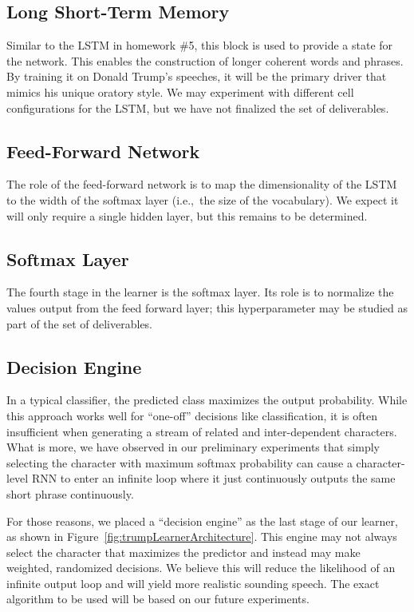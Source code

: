 \documentclass{report}
\begin{document}
  \subsection{Long Short-Term Memory}
  
  Similar to the LSTM in homework \#5, this block is used to provide a state for the network.  This enables the construction of longer coherent words and phrases.  By training it on Donald Trump's speeches, it will be the primary driver that mimics his unique oratory style.  We may experiment with different cell configurations for the LSTM, but we have not finalized the set of deliverables.
    
  \subsection{Feed-Forward Network}
  
  The role of the feed-forward network is to map the dimensionality of the LSTM to the width of the softmax layer (i.e.,~the size of the vocabulary).  We expect it will only require a single hidden layer, but this remains to be determined. 
  
  \subsection{Softmax Layer}
  
  The fourth stage in the learner is the softmax layer. Its role is to normalize the values output from the feed forward layer; this hyperparameter may be studied as part of the set of deliverables.  
  
  \subsection{Decision Engine}
  
  In a typical classifier, the predicted class maximizes the output probability.  While this approach works well for ``one-off'' decisions like classification, it is often insufficient when generating a stream of related and inter-dependent characters.  What is more, we have observed in our preliminary experiments that simply selecting the character with maximum softmax probability can cause a character-level RNN to enter an infinite loop where it just continuously outputs the same short phrase continuously.
  
  For those reasons, we placed a ``decision engine'' as the last stage of our learner, as shown in Figure~\ref{fig:trumpLearnerArchitecture}.  This engine may not always select the character that maximizes the predictor and instead may make weighted, randomized decisions.  We believe this will reduce the likelihood of an infinite output loop and will yield more realistic sounding speech.  The exact algorithm to be used will be based on our future experiments.
  
\end{document}

